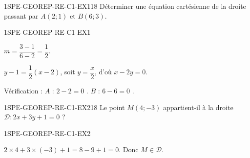 

\begin{exercice}{1SPE-GEOREP-RE-C1-EX1}{1}{8}
Déterminer une équation cartésienne de la droite passant par $A(2 ; 1)$ et $B(6 ; 3)$.
\end{exercice}


\begin{corrige}{1SPE-GEOREP-RE-C1-EX1}


$m = \dfrac{3 - 1}{6 - 2} = \dfrac{1}{2}$.

$y - 1 = \dfrac{1}{2}(x - 2)$, soit $y = \dfrac{x}{2}$, d'où $x - 2y = 0$.

Vérification : $A$ : $2 - 2 = 0$ \checkmark. $B$ : $6 - 6 = 0$ \checkmark.

\end{corrige}

\begin{exercice}{1SPE-GEOREP-RE-C1-EX2}{1}{8}
Le point $M(4 ; -3)$ appartient-il à la droite $\mathcal{D} : 2x + 3y + 1 = 0$ ?
\end{exercice}



\begin{corrige}{1SPE-GEOREP-RE-C1-EX2}

$2 \times 4 + 3 \times (-3) + 1 = 8 - 9 + 1 = 0$. Donc $M \in \mathcal{D}$.

\end{corrige}

